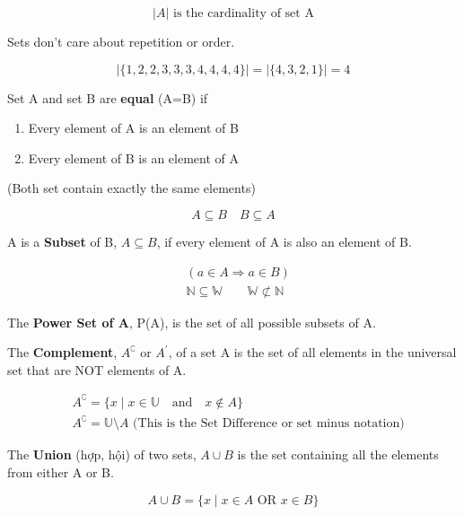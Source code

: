 \[|A| \text{ is the cardinality of set A}\]

Sets don't care about repetition or order.

\[ |\{1,2,2,3,3,3,4,4,4,4\}|=|\{4,3,2,1\}|=4 \]

\vspace{5 mm}

Set A and set B are \textbf{equal} (A=B) if

\begin{enumerate}
  \item Every element of A is an element of B
  \item Every element of B is an element of A
\end{enumerate}

(Both set contain exactly the same elements)

\[A \subseteq B\quad B \subseteq A\]

\vspace{7 mm}

A is a \textbf{Subset} of B, $A \subseteq B$, if every element of A is also an element of B.

\[
  \begin{aligned}
    &(a\in A \Longrightarrow a\in B)\\
    &\mathbb{N} \subseteq \mathbb{W} \qquad \mathbb{W} \not\subset \mathbb{N}
  \end{aligned}
\]

The \textbf{Power Set of A}, P(A), is the set of all possible subsets of A.

\vspace{10 mm}

The \textbf{Complement}, \(A^\complement \text{ or } A^\prime\), of a set A is the set of all elements in the universal set that are NOT elements of A.

\[
  \begin{aligned}
    &A^\complement = \{x \mid x \in \mathbb{U} \quad \text{and} \quad x \not\in A \}\\
    &A^\complement = \mathbb{U} \setminus A \text{ (This is the Set Difference or set minus notation)}
  \end{aligned}
\]

\vspace{8 mm}

The \textbf{Union} (hợp, hội) of two sets, $A \cup B$ is the set containing all the elements from either A or B.

\[A \cup B = \{ x \mid x \in A \text{ OR } x \in B \}\]

